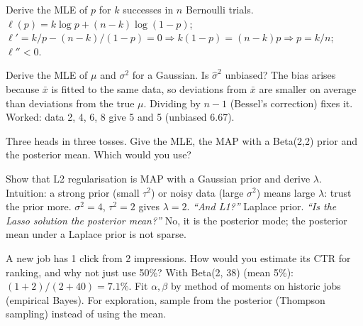 \begin{qa}{Derive the MLE of $p$ for $k$ successes in $n$ Bernoulli trials.}
\why $\ell(p) = k\log p + (n-k)\log(1-p)$; $\ell' = k/p - (n-k)/(1-p) = 0\Rightarrow k(1-p) = (n-k)p\Rightarrow p = k/n$; $\ell'' < 0$.
\end{qa}

\begin{qa}{Derive the MLE of $\mu$ and $\sigma^2$ for a Gaussian. Is $\hat\sigma^2$ unbiased?}
\why The bias arises because $\bar x$ is fitted to the same data, so deviations from $\bar x$ are smaller on average than deviations from the true $\mu$.
Dividing by $n-1$ (Bessel's correction) fixes it. Worked: data 2, 4, 6, 8 give 5 and 5 (unbiased 6.67).
\end{qa}

\begin{qa}{Three heads in three tosses. Give the MLE, the MAP with a Beta(2,2) prior and the posterior mean. Which would you use?}
\end{qa}

\begin{qa}{\deep Show that L2 regularisation is MAP with a Gaussian prior and derive $\lambda$.}
\why Intuition: a strong prior (small $\tau^2$) or noisy data (large $\sigma^2$) means large $\lambda$: trust the prior more. $\sigma^2 = 4$, $\tau^2 = 2$
gives $\lambda = 2$.
\pushes \emph{``And L1?''} Laplace prior. \emph{``Is the Lasso solution the posterior mean?''} No, it is the posterior mode; the posterior mean under a
Laplace prior is not sparse.
\end{qa}

\begin{qa}{\deep A new job has 1 click from 2 impressions. How would you estimate its CTR for ranking, and why not just use 50\%?}
\why With Beta(2, 38) (mean 5\%): $(1+2)/(2+40) = 7.1\%$. Fit $\alpha,\beta$ by method of moments on historic jobs (empirical Bayes). For exploration,
sample from the posterior (Thompson sampling) instead of using the mean.
\end{qa}

